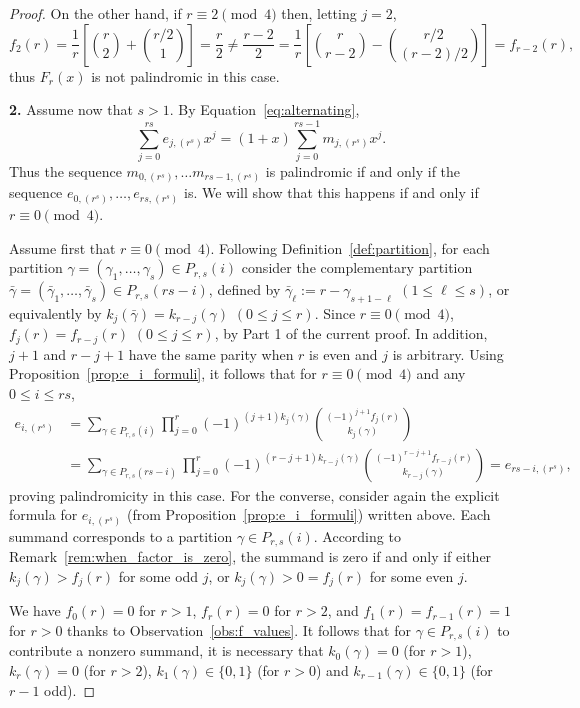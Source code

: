 \documentclass[10pt]{article}
\theoremstyle{definition}
\newcommand{\bgamma}{\bar\gamma}
\begin{document}
\begin{proof}
On the other hand, if 
$r\equiv 2 \pmod 4$ then,  
letting $j = 2$,
\[
    f_2(r) 
    = \frac{1}{r} \left[ \binom{r}{2} + \binom{r/2}{1} \right]
    = \frac{r}{2}
    \ne \frac{r-2}{2}
    = \frac{1}{r} \left[ \binom{r}{r-2} - \binom{r/2}{(r-2)/2} \right]
    = f_{r-2}(r),
\]
thus $F_r(x)$ is not palindromic in this case.

{\bf 2.}  
Assume now that $s > 1$.
By Equation~\eqref{eq:alternating}, 
\[
    \sum_{j=0}^{rs} e_{j,(r^s)}x^j
    = (1+x) \sum_{j=0}^{rs-1} m_{j,(r^s)}x^j.
\]
Thus the sequence $m_{0,(r^s)}, \ldots m_{rs-1,(r^s)}$ is palindromic if and only if the sequence $e_{0,(r^s)}, \ldots, e_{rs,(r^s)}$ is.
We will show that this happens if and only if $r \equiv 0 \pmod 4$.

Assume first that $r \equiv 0 \pmod 4$.
Following Definition~\ref{def:partition},
for each partition 
$\gamma  = (\gamma_1, \ldots, \gamma_s) \in P_{r,s}(i)$ 
consider the complementary partition 
$\bgamma = (\bgamma_1, \ldots, \bgamma_s) \in P_{r,s}(rs-i)$, defined by  
$\bgamma_\ell := r-\gamma_{s+1-\ell}$ $(1 \le \ell \le s)$,
or equivalently by
$k_j(\bgamma) = k_{r-j}(\gamma)$ $(0 \le j \le r)$.
Since $r \equiv 0 \pmod 4$,
$f_j(r) = f_{r-j}(r)$ $(0 \le j \le r)$,
by Part 1 of the current proof.
In addition, $j+1$ and $r-j+1$ have the same parity when $r$ is even and $j$ is arbitrary. 
Using Proposition~\ref{prop:e_i_formuli},
it follows that for $r\equiv 0 \pmod 4$ and any $0 \le i \le rs$,
\begin{align*}
    e_{i,(r^s)}
    &= \sum_{\gamma \in P_{r,s}(i)} \prod_{j=0}^{r}
    (-1)^{(j+1)k_j(\gamma)} \binom{(-1)^{j+1} f_j(r)}{k_j(\gamma)} \\
    &= \sum_{\gamma \in P_{r,s}(rs-i)} \prod_{j=0}^{r}
    (-1)^{(r-j+1)k_{r-j}(\gamma)} \binom{(-1)^{r-j+1} f_{r-j}(r)}{k_{r-j}(\gamma)}= e_{rs-i,(r^s)},  
\end{align*}
proving palindromicity in this case. 		
For the converse,
    consider again the explicit formula for $e_{i,(r^s)}$ (from Proposition~\ref{prop:e_i_formuli}) written above. 
    Each summand corresponds to a partition $\gamma \in P_{r,s}(i)$. 
    According to Remark~\ref{rem:when_factor_is_zero}, the summand is zero if and only if either
    $k_j(\gamma) > f_j(r)$ for some odd $j$, or
    $k_j(\gamma) > 0 = f_j(r)$ for some even $j$.
    
       We have
        $f_0(r) = 0$ for $r>1$, 
        $f_r(r) = 0$ for $r>2$, and
        $f_1(r) = f_{r-1}(r) = 1$ for $r>0$ thanks to Observation~\ref{obs:f_values}.
        It follows that for $\gamma \in P_{r,s}(i)$ to contribute a nonzero summand, it is necessary that
        $k_0(\gamma) = 0$ (for $r>1$), 
        $k_r(\gamma) = 0$ (for $r>2$), 
        $k_1(\gamma) \in \{0,1\}$ (for $r>0$) and 
        $k_{r-1}(\gamma) \in \{0,1\}$ (for $r-1$ odd).
        

\end{proof}
\end{document}
